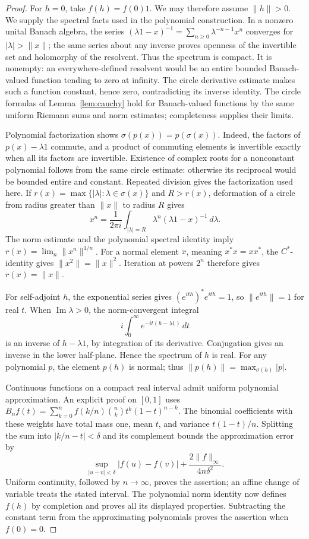 \documentclass[11pt]{article}
\theoremstyle{definition}
\theoremstyle{remark}
\numberwithin{equation}{section}
\begin{document}
\begin{proof}
For $h=0$, take $f(h)=f(0)1$.  We may therefore assume $\|h\|>0$.
We supply the spectral facts used in the polynomial construction.
In a nonzero unital Banach algebra, the series
$(\lambda1-x)^{-1}=\sum_{n\geq0}\lambda^{-n-1}x^n$ converges for
$|\lambda|>\|x\|$; the same series about any inverse proves openness of the
invertible set and holomorphy of the resolvent.
Thus the spectrum is compact.  It is nonempty: an everywhere-defined
resolvent would be an entire bounded Banach-valued function tending to zero
at infinity.  The circle derivative estimate makes such a function constant,
hence zero, contradicting its inverse identity.
The circle formulas of Lemma~\ref{lem:cauchy} hold for Banach-valued
functions by the same uniform Riemann sums and norm estimates; completeness
supplies their limits.

Polynomial factorization shows $\sigma(p(x))=p(\sigma(x))$.
Indeed, the factors of $p(x)-\lambda1$ commute, and a product of commuting
elements is invertible exactly when all its factors are invertible.
Existence of complex roots for a nonconstant polynomial follows from the
same circle estimate: otherwise its reciprocal would be bounded entire and
constant.  Repeated division gives the factorization used here.
If $r(x)=\max\{|\lambda|:\lambda\in\sigma(x)\}$ and $R>r(x)$, deformation
of a circle from radius greater than $\|x\|$ to radius $R$ gives
\[
 x^n=\frac1{2\pi i}\int_{|\lambda|=R}
           \lambda^n(\lambda1-x)^{-1}\,d\lambda.
\]
The norm estimate and the polynomial spectral identity imply
$r(x)=\lim_n\|x^n\|^{1/n}$.
For a normal element $x$, meaning $x^*x=xx^*$, the $C^*$-identity gives
$\|x^2\|=\|x\|^2$.  Iteration at powers $2^n$ therefore gives
$r(x)=\|x\|$.

For self-adjoint $h$, the exponential series gives
$(e^{ith})^*e^{ith}=1$, so $\|e^{ith}\|=1$ for real $t$.
When $\operatorname{Im}\lambda>0$, the norm-convergent integral
\[
 i\int_0^\infty e^{-it(h-\lambda1)}\,dt
\]
is an inverse of $h-\lambda1$, by integration of its derivative.
Conjugation gives an inverse in the lower half-plane.  Hence the spectrum
of $h$ is real.  For any polynomial $p$, the element $p(h)$ is normal;
thus $\|p(h)\|=\max_{\sigma(h)}|p|$.

Continuous functions on a compact real interval admit uniform polynomial
approximation.  An explicit proof on $[0,1]$ uses
$B_nf(t)=\sum_{k=0}^n f(k/n)\binom nk t^k(1-t)^{n-k}$.
The binomial coefficients with these weights have total mass one, mean
$t$, and variance $t(1-t)/n$.  Splitting the sum into $|k/n-t|<\delta$
and its complement bounds the approximation error by
\[
 \sup_{|u-v|<\delta}|f(u)-f(v)|+
       \frac{2\|f\|_\infty}{4n\delta^2}.
\]
Uniform continuity, followed by $n\to\infty$, proves the assertion;
an affine change of variable treats the stated interval.
The polynomial norm identity now defines $f(h)$ by completion and proves
all its displayed properties.  Subtracting the constant term from the
approximating polynomials proves the assertion when $f(0)=0$.


\end{proof}
\end{document}
